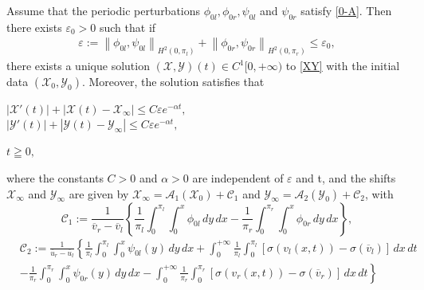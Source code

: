 \documentclass[10pt,a4paper]{amsart}
\def\X{\mathcal{X}}
\def\Y{\mathcal{Y}}
\def\aul{\overline{u}_l}
\def\aur{\overline{u}_r}
\def\avl{\overline{v}_l}
\def\avr{\overline{v}_r}
\newcommand{\norm}[1]{\left\lVert #1 \right\rVert}
\begin{document}
\begin{lemma}\label{XYdecay}
	Assume that the periodic perturbations $\phi_{0l},\phi_{0r},\psi_{0l}$ and $\psi_{0r}$ satisfy \eqref{0-A}. Then there exists $\varepsilon_0>0$ such that
	if 
	\begin{align}\label{small assumption for shifts}
		\varepsilon:=\norm{\phi_{0l},\psi_{0l}}_{H^2(0,\pi_l)}+\norm{\phi_{0r},\psi_{0r}}_{H^2(0,\pi_r)}\leq \varepsilon_0,
	\end{align}
	there exists a unique solution $(\X,\Y)(t) \in C^1[0,+\infty)$ to \eqref{XY} with the initial data $(\X_0,\Y_0)$. Moreover, the solution satisfies that
	\begin{center}
		\begin{minipage}[c]{7cm}
			$ |\X'(t)|+\left|\mathcal{X}(t)-\mathcal{X}_{\infty}\right| \leq  C \varepsilon e^{-\alpha t},$ \\
		  $|\Y'(t)|+\left|\mathcal{Y}(t)-\mathcal{Y}_{\infty}\right| \leq C \varepsilon e^{-\alpha t},$
		\end{minipage}
		\begin{minipage}[c]{2cm} 
			$ t \geqq 0,$
		\end{minipage}
	\end{center}
	where the constants $C>0$ and $\alpha>0$ are independent of $\varepsilon$ and t, and the shifts $\X_{\infty}$ and $\Y_{\infty}$ are given by $\X_{\infty}=\mathcal{A}_1(\X_0)+\mathcal{C} _1$
	and $\Y_{\infty}=\mathcal{A} _2(\Y_0)+\mathcal{C} _2$, with
	\begin{equation}\label{C1}
		\mathcal{C} _1:=\frac{1}{\avr-\avl}\left\{\frac{1}{\pi_l}\int_{0}^{\pi_l} \int_{0}^{x} \phi_{0l} \,dy  \,dx -\frac{1}{\pi_r}\int_{0}^{\pi_r} \int_{0}^{x} \phi_{0r} \,dy  \,dx\right\},
	\end{equation}
	\begin{equation}\label{C2}
		\begin{aligned}
		&\mathcal{C}_2:=\frac{1}{\aur-\aul}\left\{\frac{1}{\pi_l}\int_{0}^{\pi_l} \int_{0}^{x} \psi_{0l}(y) \,dy  \,dx+\int_{0}^{+\infty}\frac{1}{\pi_l}\int_{0}^{\pi_l}[\sigma(v_l(x,t))-\sigma(\avl)] \,dx \,dt\right.\\ 
		&\left.-\frac{1}{\pi_r}\int_{0}^{\pi_r} \int_{0}^{x} \psi_{0r}(y) \,dy  \,dx-\int_{0}^{+\infty}\frac{1}{\pi_r}\int_{0}^{\pi_r}[\sigma(v_r(x,t))-\sigma(\avr)] \,dx \,dt\right\}
	    \end{aligned}
	\end{equation}
\end{lemma}
\end{document}

